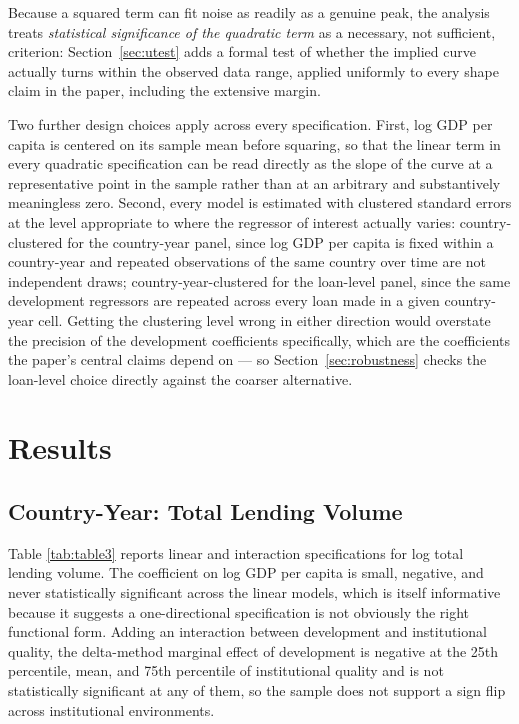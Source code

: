 \documentclass[12pt]{article}
\begin{document}
Because a squared term can fit noise as readily as a genuine peak, the analysis treats
\emph{statistical significance of the quadratic term} as a necessary, not sufficient, criterion:
Section~\ref{sec:utest} adds a formal test of whether the implied curve actually turns within the
observed data range, applied uniformly to every shape claim in the paper, including the extensive
margin.

Two further design choices apply across every specification. First, log GDP per capita is centered on
its sample mean before squaring, so that the linear term in every quadratic specification can be read
directly as the slope of the curve at a representative point in the sample rather than at an
arbitrary and substantively meaningless zero. Second, every model is estimated with clustered standard
errors at the level appropriate to where the regressor of interest actually varies: country-clustered
for the country-year panel, since log GDP per capita is fixed within a country-year and repeated
observations of the same country over time are not independent draws; country-year-clustered for the
loan-level panel, since the same development regressors are repeated across every loan made in a given
country-year cell. Getting the clustering level wrong in either direction would overstate the precision
of the development coefficients specifically, which are the coefficients the paper's central claims
depend on --- so Section~\ref{sec:robustness} checks the loan-level choice directly against the
coarser alternative.

\section{Results}
\label{sec:results}

\subsection{Country-Year: Total Lending Volume}
\label{sec:results-country}

Table \ref{tab:table3} reports linear and interaction specifications for log total lending volume. The
coefficient on log GDP per capita is small, negative, and never statistically significant across the
linear models, which is itself informative because it suggests a one-directional specification is not
obviously the right functional form. Adding an interaction between development and institutional
quality, the delta-method marginal effect of development is negative at the 25th percentile, mean, and
75th percentile of institutional quality and is not statistically significant at any of them, so the
sample does not support a sign flip across institutional environments.
\end{document}
